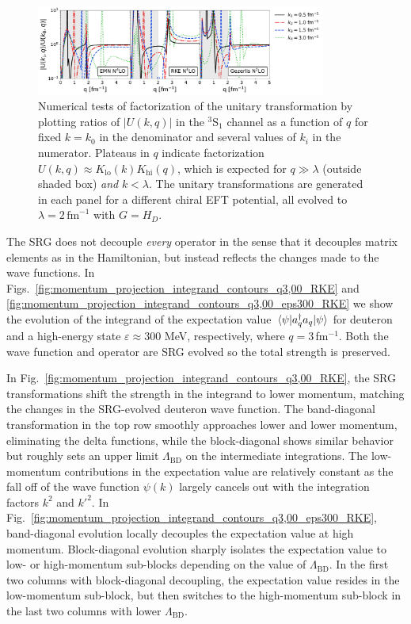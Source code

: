 \documentclass[10pt,aps,prc,floatfix,twocolumn,nofootinbib]{revtex4-1}
\newcommand{\LambdaBD}{{\Lambda_{\text{BD}}}}
\newcommand{\ataq}{a^{\dagger}_q a_q}
\newcommand{\Klo}{K_{\text{lo}}}
\newcommand{\Khi}{K_{\text{hi}}}
\begin{document}
%
\begin{figure}[tbh]
	\includegraphics[clip,width=0.85\textwidth]{unitary_transformation_ratios_k0_0,1_kpoints_0,5_1,0_1,5_3,0kvnns_79_111_222_3S1_Wegner.pdf}%
	\caption{Numerical tests of factorization of the unitary transformation  by plotting ratios of $|U(k,q)|$ in the $^3$S$_1$ channel as a function of $q$ for fixed $k=k_0$ in the denominator and several values of $k_i$ in the numerator.
    Plateaus in $q$ indicate factorization $U(k,q) \approx \Klo(k)\Khi(q)$, which is expected for $q\gg\lambda$ (outside shaded box) \emph{and} $k < \lambda$. The unitary transformations are generated in each panel for a different chiral EFT potential, all evolved to $\lambda = 2\,\mbox{fm}^{-1}$ with $G = H_D$.}
	\label{fig:factorization_ratios}
\end{figure}
%

The SRG does not decouple \emph{every} operator in the sense that it decouples matrix elements as in the Hamiltonian, but instead reflects the changes made to the wave functions.
In Figs.~\ref{fig:momentum_projection_integrand_contours_q3,00_RKE} and \ref{fig:momentum_projection_integrand_contours_q3,00_eps300_RKE} we show the evolution of the integrand of the expectation value $\mel{\psi}{\ataq}{\psi}$ for deuteron and a high-energy state $\varepsilon \approx 300$ MeV, respectively, where $q=3$\,fm$^{-1}$.
Both the wave function and operator are SRG evolved so the total strength is preserved.


In Fig.~\ref{fig:momentum_projection_integrand_contours_q3,00_RKE}, the SRG transformations shift the strength in the integrand to lower momentum, matching the changes in the SRG-evolved deuteron wave function.
The band-diagonal transformation in the top row smoothly approaches lower and lower momentum, eliminating the delta functions, while the block-diagonal shows similar behavior but roughly sets an upper limit $\LambdaBD$ on the intermediate integrations.
The low-momentum contributions in the expectation value are relatively constant as the fall off of the wave function $\psi(k)$ largely cancels out with the integration factors $k^2$ and $k'^2$.
In Fig.~\ref{fig:momentum_projection_integrand_contours_q3,00_eps300_RKE}, band-diagonal evolution locally decouples the expectation value at high momentum.
Block-diagonal evolution sharply isolates the expectation value to low- or high-momentum sub-blocks depending on the value of $\LambdaBD$.
In the first two columns with block-diagonal decoupling, the expectation value resides in the low-momentum sub-block, but then switches to the high-momentum sub-block in the last two columns with lower $\LambdaBD$.
\end{document}
